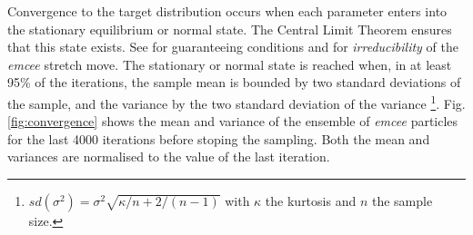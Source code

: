 Convergence to the target distribution occurs when each parameter enters into the stationary equilibrium or normal state. The Central Limit Theorem ensures that this state exists. See \citet{Roberts2004} for guaranteeing conditions and \citet{Goodman2010} for \emph{irreducibility} of the \emph{emcee} stretch move. The stationary or normal state is reached when, in at least 95\% of the iterations, the sample mean is bounded by two standard deviations of the sample, and the variance by the two standard deviation of the variance \footnote{
$sd(\sigma^2)=\sigma^2 \sqrt{\kappa/n + 2/(n-1)}$ with $\kappa$ the kurtosis and $n$ the sample size.
}. Fig. \ref{fig:convergence} shows the mean and variance of the ensemble of \emph{emcee} particles for the last 4000 iterations before stoping the sampling. Both the mean and variances are normalised to the value of the last iteration.


